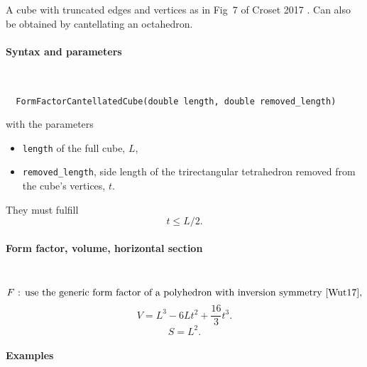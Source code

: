 A cube with truncated edges and vertices as in Fig~7 of Croset 2017 \cite{Cro17}.
Can also be obtained by cantellating an octahedron.
\FloatBarrier

\paragraph{Syntax and parameters}\strut\\[-2ex plus .2ex minus .2ex]
\begin{lstlisting}
  FormFactorCantellatedCube(double length, double removed_length)
\end{lstlisting}
with the parameters
\begin{itemize}
\item \texttt{length} of the full cube, $L$,
\item \texttt{removed\_length}, side length of the trirectangular tetrahedron removed from the cube's vertices, $t$.
\end{itemize}
They must fulfill
\begin{displaymath}
  t \le L/2.
\end{displaymath}

\paragraph{Form factor, volume, horizontal section}\strut\\
\begin{equation*}
  F \text{~: use the generic form factor of a polyhedron
             with inversion symmetry~\cite{Wut17},}
\end{equation*}
\begin{equation*}
  V = L^3 - 6 L t^2 + \frac{16}{3} t^3.
\end{equation*}
\begin{equation*}
  S = L^2.
\end{equation*}

\paragraph{Examples}\strut


